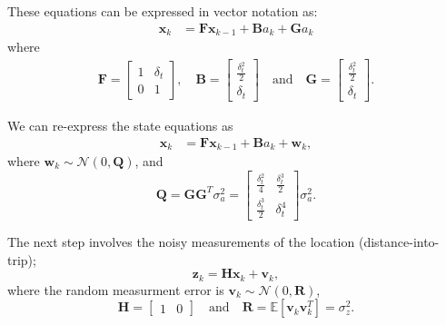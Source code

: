 \documentclass[11pt]{article}\usepackage[]{graphicx}\usepackage[]{color}
\begin{document}
These equations can be expressed in vector notation as:
\begin{align}
  \label{eq:state_matrix_eqns}
  \mathbf{x}_k &= \mathbf{F} \mathbf{x}_{k-1} + \mathbf{B} a_k + \mathbf{G} a_k
\end{align}
where
\begin{align}
  \mathbf{F} =
  \begin{bmatrix}
    1 & \delta_t \\
    0 & 1
  \end{bmatrix},
  \quad
  \mathbf{B} =
  \begin{bmatrix}
    \frac{\delta_t^2}{2} \\ \delta_t
  \end{bmatrix}
  \quad\text{and}\quad
  \mathbf{G} =
  \begin{bmatrix}
    \frac{\delta_t^2}{2} \\ \delta_t
  \end{bmatrix}.
\end{align}


We can re-express the state equations as
\begin{align}
  \label{eq:state_matrix_eqns2}
  \mathbf{x}_k &= \mathbf{F} \mathbf{x}_{k-1} + \mathbf{B} a_k + \mathbf{w}_k,
\end{align}
where $\mathbf{w}_k \sim \mathcal{N}\left(0,\mathbf{Q}\right)$, and
\begin{equation}
  \label{eq:systm_variance}
  \mathbf{Q} = \mathbf{G} \mathbf{G}^T \sigma_a^2
  =
  \begin{bmatrix}
    \frac{\delta_t^2}{4} & \frac{\delta_t^3}{2} \\
    \frac{\delta_t^3}{2} & \delta_t^4
  \end{bmatrix} \sigma_a^2.
\end{equation}



The next step involves the noisy measurements of the location (distance-into-trip);
\begin{equation}
  \label{eq:measurements}
  \mathbf{z}_k = \mathbf{H}\mathbf{x}_k + \mathbf{v}_k,
\end{equation}
where the random measurment error is $\mathbf{v}_k \sim \mathcal{N}\left(0, \mathbf{R}\right)$,
\begin{equation}
  \label{eq:moremats}
  \mathbf{H} =
  \begin{bmatrix}
    1 & 0
  \end{bmatrix}
  \quad \text{and} \quad \mathbf{R} = \mathbb{E}\left[\mathbf{v}_k \mathbf{v}_k^T\right] = \sigma_z^2.
\end{equation}
\end{document}
